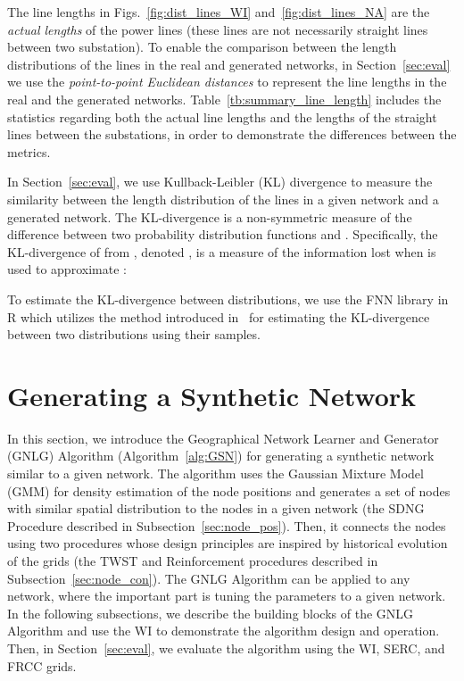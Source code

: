 \documentclass[10pt,journal]{IEEEtran}
\begin{document}
The line lengths in Figs.~\ref{fig:dist_lines_WI} and~\ref{fig:dist_lines_NA} are the \emph{actual lengths} of the power lines (these lines are not necessarily straight lines between two substation). To enable the comparison between the length distributions of the lines in the real and generated networks, in Section~\ref{sec:eval} we use the \emph{point-to-point Euclidean distances} to represent the line lengths in the real and the generated networks.  Table~\ref{tb:summary_line_length} includes the statistics regarding both the actual line lengths and the lengths of the straight lines between the substations, in order to demonstrate the differences between the metrics.

In Section~\ref{sec:eval}, we use Kullback-Leibler (KL) divergence to measure the similarity between the length distribution of the lines in a given network and a generated network.  The KL-divergence is a non-symmetric measure of the difference between two probability distribution functions  and . Specifically, the KL-divergence of  from , denoted , is a measure of the information lost when  is used to approximate :
 
 To estimate the KL-divergence between distributions, we use the {\ttfamily FNN} library in {\ttfamily R} which utilizes the method introduced in~\cite{boltz2009high} for estimating the KL-divergence between two distributions using their samples.



\section{Generating a Synthetic Network}\label{sec:gen_net}
In this section, we introduce the Geographical Network Learner and Generator (GNLG) Algorithm (Algorithm~\ref{alg:GSN}) for generating a synthetic network similar to a given network. The algorithm uses the Gaussian Mixture Model (GMM) for density estimation of the node positions and generates a set of nodes with similar spatial distribution to the nodes in a given network (the SDNG Procedure described in Subsection~\ref{sec:node_pos}). Then, it connects the nodes using two procedures whose design principles are inspired by historical evolution of the grids (the TWST and Reinforcement procedures described in Subsection~\ref{sec:node_con}).
The GNLG Algorithm can be applied to any network, where the important part is tuning the parameters to a given network.
In the following subsections, we describe the building blocks of the GNLG Algorithm and use the WI to demonstrate the algorithm design and operation. Then, in Section~\ref{sec:eval}, we evaluate the algorithm using the WI, SERC, and FRCC grids.
\end{document}
